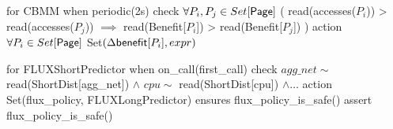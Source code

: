 

\begin{dslbox}[title={Listing~\theguardcount: Guardrail for CBMM}, glabel=lst:benefit-correction]
for CBMM
when periodic(2s)
check $\forall P_i,P_j \in Set[{\sf Page}]$ (
      read(accesses($P_i$)) > read(accesses($P_j$))
      $\implies$ read(Benefit[$P_i$]) > read(Benefit[$P_j$])
  )
action $\forall P_i \in Set[{\sf Page}]$ Set$(\Delta{\sf benefit}[P_i], expr)$
\end{dslbox}


\begin{dslbox}[title={Listing~\theguardcount: In-distribution guardrail for FLUX}, glabel=lst:in-dist-short]
for FLUXShortPredictor
when on_call(first_call)
check $agg\_net \sim$ read(ShortDist[agg_net]) $\wedge$
      $cpu \sim$ read(ShortDist[cpu]) $\wedge \dots$
action Set(flux_policy, FLUXLongPredictor)
ensures flux_policy_is_safe()
assert flux_policy_is_safe()
\end{dslbox}



